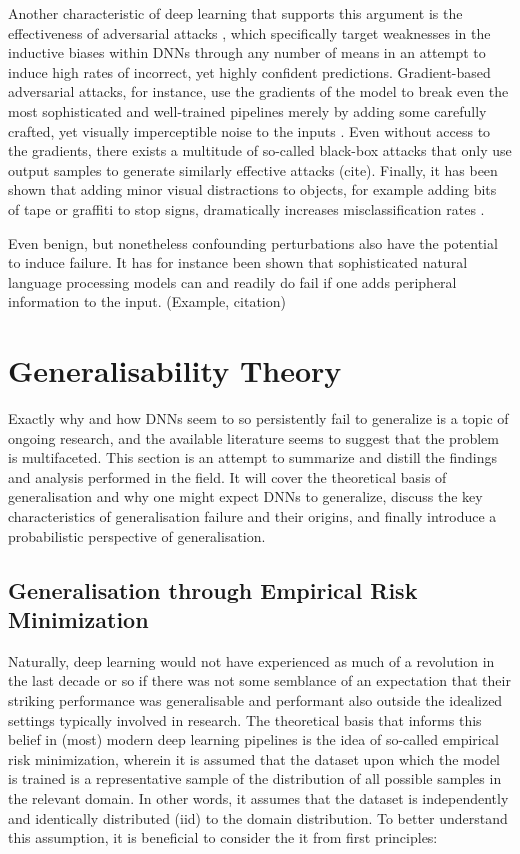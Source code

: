 	Another characteristic of deep learning that supports this argument is the effectiveness of adversarial attacks \cite{adversarial_bugs_features}, which specifically target weaknesses in the inductive biases within DNNs through any number of means in an attempt to induce high rates of incorrect, yet highly confident predictions. Gradient-based adversarial attacks, for instance, use the gradients of the model to break even the most sophisticated and well-trained pipelines merely by adding some carefully crafted, yet visually imperceptible noise to the inputs \cite{adversarial_attacks}. Even without access to the gradients, there exists a multitude of so-called black-box attacks that only use output samples to generate similarly effective attacks (cite). Finally, it has been shown that adding minor visual distractions to objects, for example adding bits of tape or graffiti to stop signs, dramatically increases misclassification rates \cite{physical_attacks}. 
	
	Even benign, but nonetheless confounding perturbations also have the potential to induce failure. It has for instance been shown that sophisticated natural language processing models can and readily do fail if one adds peripheral information to the input. (Example, citation)	 
	
\section{Generalisability Theory}
	Exactly why and how DNNs seem to so persistently fail to generalize is a topic of ongoing research, and the available literature seems to suggest that the problem is multifaceted. This section is an attempt to summarize and distill the findings and analysis performed in the field. It will cover the theoretical basis of generalisation and why one might expect DNNs to generalize, discuss the key characteristics of generalisation failure and their origins, and finally introduce a probabilistic perspective of generalisation.
	\subsection{Generalisation through Empirical Risk Minimization} 
		Naturally, deep learning would not have experienced as much of a revolution in the last decade or so if there was not some semblance of an expectation that their striking performance was generalisable and performant also outside the idealized settings typically involved in research. The theoretical basis that informs this belief in (most) modern deep learning pipelines is the idea of so-called empirical risk minimization, wherein it is assumed that the dataset upon which the model is trained is a representative sample of the distribution of all possible samples in the relevant domain. In other words, it assumes that the dataset is independently and identically distributed (iid) to the domain distribution. To better understand this assumption, it is beneficial to consider the it from first principles: 
		
